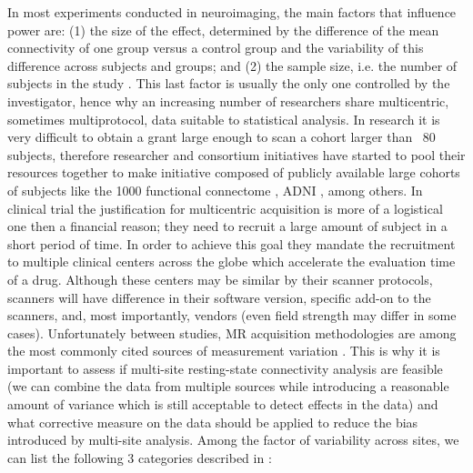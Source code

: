 \documentclass[authoryear]{elsarticle}
\begin{document}
In most experiments conducted in neuroimaging, the main factors that influence power are: (1) the size of the effect, determined by the difference of the mean connectivity of one group versus a control group and the variability of this difference across subjects and groups; and (2) the sample size, i.e. the number of subjects in the study \citep{Desmond2002}. This last factor is usually the only one controlled by the investigator, hence why an increasing number of researchers share multicentric, sometimes multiprotocol, data suitable to statistical analysis. In research it is very difficult to obtain a grant large enough to scan a cohort larger than ~80 subjects, therefore researcher and consortium initiatives have started to pool their resources together to make initiative composed of publicly available large cohorts of subjects like the 1000 functional connectome \citep{Biswal2010}, ADNI \citep{
Mueller2005}, among 
others. In clinical trial the justification for multicentric acquisition is more of a logistical one then a financial reason; they need to recruit a large amount of subject in a short period of time. In order to achieve this goal they mandate the recruitment to multiple clinical centers across the globe which accelerate the evaluation time of a drug. Although these centers may be similar by their scanner protocols, scanners will have difference in their software version, specific add-on to the scanners, and, most importantly, vendors (even field strength may differ in some cases). Unfortunately between studies, MR acquisition methodologies are among the most commonly cited sources of measurement variation \citep{Friedman2006}. This is why it is important to assess if multi-site resting-state connectivity analysis are feasible (we can combine the data from multiple sources while introducing a reasonable amount of variance which is still acceptable to detect effects in the data) and what corrective measure on 
the data should be applied to reduce the bias introduced by multi-site analysis. Among the factor of variability across sites, we can list the following 3 categories described in \citep{Yan2013a}:
\end{document}
